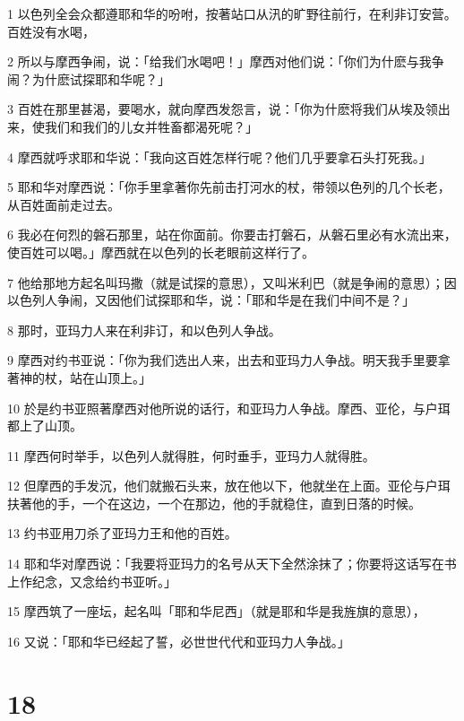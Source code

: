 \par 1 以色列全会众都遵耶和华的吩咐，按著站口从汛的旷野往前行，在利非订安营。百姓没有水喝，
\par 2 所以与摩西争闹，说：「给我们水喝吧！」摩西对他们说：「你们为什麽与我争闹？为什麽试探耶和华呢？」
\par 3 百姓在那里甚渴，要喝水，就向摩西发怨言，说：「你为什麽将我们从埃及领出来，使我们和我们的儿女并牲畜都渴死呢？」
\par 4 摩西就呼求耶和华说：「我向这百姓怎样行呢？他们几乎要拿石头打死我。」
\par 5 耶和华对摩西说：「你手里拿著你先前击打河水的杖，带领以色列的几个长老，从百姓面前走过去。
\par 6 我必在何烈的磐石那里，站在你面前。你要击打磐石，从磐石里必有水流出来，使百姓可以喝。」摩西就在以色列的长老眼前这样行了。
\par 7 他给那地方起名叫玛撒（就是试探的意思），又叫米利巴（就是争闹的意思）；因以色列人争闹，又因他们试探耶和华，说：「耶和华是在我们中间不是？」
\par 8 那时，亚玛力人来在利非订，和以色列人争战。
\par 9 摩西对约书亚说：「你为我们选出人来，出去和亚玛力人争战。明天我手里要拿著神的杖，站在山顶上。」
\par 10 於是约书亚照著摩西对他所说的话行，和亚玛力人争战。摩西、亚伦，与户珥都上了山顶。
\par 11 摩西何时举手，以色列人就得胜，何时垂手，亚玛力人就得胜。
\par 12 但摩西的手发沉，他们就搬石头来，放在他以下，他就坐在上面。亚伦与户珥扶著他的手，一个在这边，一个在那边，他的手就稳住，直到日落的时候。
\par 13 约书亚用刀杀了亚玛力王和他的百姓。
\par 14 耶和华对摩西说：「我要将亚玛力的名号从天下全然涂抹了；你要将这话写在书上作纪念，又念给约书亚听。」
\par 15 摩西筑了一座坛，起名叫「耶和华尼西」（就是耶和华是我旌旗的意思），
\par 16 又说：「耶和华已经起了誓，必世世代代和亚玛力人争战。」

\chapter{18}

